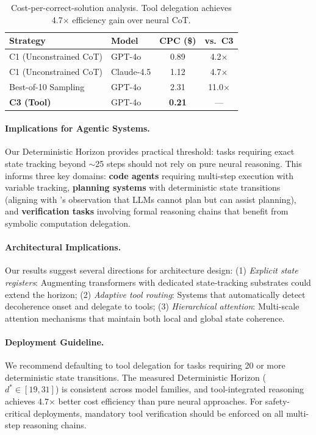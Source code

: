 \documentclass{article}
\theoremstyle{plain}
\theoremstyle{definition}
\theoremstyle{remark}
\begin{document}
\begin{table}[t]
\caption{Cost-per-correct-solution analysis. Tool delegation achieves 4.7$\times$ efficiency gain over neural CoT.}
\label{tab:cost_main}
\vskip 0.1in
\centering
\footnotesize
\begin{tabular}{@{}llcc@{}}
\toprule
\textbf{Strategy} & \textbf{Model} & \textbf{CPC (\$)} & \textbf{vs.\ C3} \\
\midrule
C1 (Unconstrained CoT) & GPT-4o & 0.89 & 4.2$\times$ \\
C1 (Unconstrained CoT) & Claude-4.5 & 1.12 & 4.7$\times$ \\
Best-of-10 Sampling & GPT-4o & 2.31 & 11.0$\times$ \\
\textbf{C3 (Tool)} & GPT-4o & \textbf{0.21} & --- \\
\bottomrule
\end{tabular}
\vskip -0.1in
\end{table}

\paragraph{Implications for Agentic Systems.} Our Deterministic Horizon provides practical threshold: tasks requiring exact state tracking beyond $\sim$25 steps should not rely on pure neural reasoning. This informs three key domains: \textbf{code agents} requiring multi-step execution with variable tracking, \textbf{planning systems} with deterministic state transitions (aligning with \citeauthor{kambhampati2024llms}'s observation that LLMs cannot plan but can assist planning), and \textbf{verification tasks} involving formal reasoning chains that benefit from symbolic computation delegation.

\paragraph{Architectural Implications.} Our results suggest several directions for architecture design: (1) \emph{Explicit state registers}: Augmenting transformers with dedicated state-tracking substrates could extend the horizon; (2) \emph{Adaptive tool routing}: Systems that automatically detect decoherence onset and delegate to tools; (3) \emph{Hierarchical attention}: Multi-scale attention mechanisms that maintain both local and global state coherence.

\paragraph{Deployment Guideline.}
We recommend defaulting to tool delegation for tasks requiring 20 or more deterministic state transitions. The measured Deterministic Horizon ($d^* \in [19, 31]$) is consistent across model families, and tool-integrated reasoning achieves 4.7$\times$ better cost efficiency than pure neural approaches. For safety-critical deployments, mandatory tool verification should be enforced on all multi-step reasoning chains.
\end{document}
